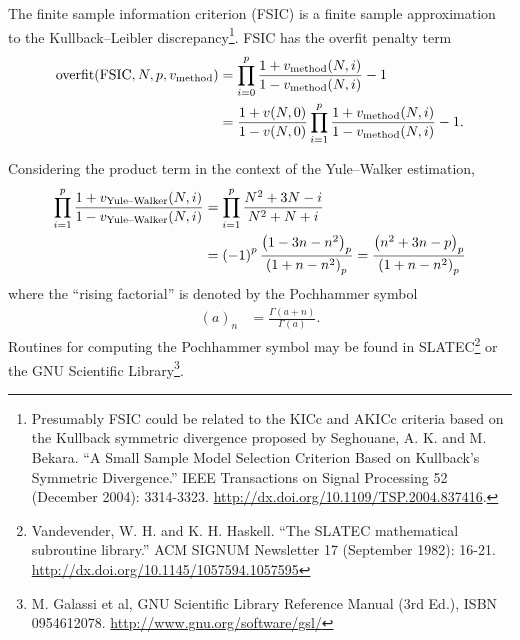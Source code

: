 \documentclass[12pt,letterpaper]{article}
\newcommand{\Pochhammer}[2]{\left(#1\right)_{#2}}
\begin{document}
The finite sample information criterion (FSIC) is a finite sample approximation
to the Kullback--Leibler discrepancy\footnote{ Presumably FSIC could be related
to the KICc and AKICc criteria based on the Kullback symmetric divergence
proposed by Seghouane, A. K. and M. Bekara.  ``A Small Sample Model Selection
Criterion Based on Kullback's Symmetric Divergence.'' IEEE Transactions on
Signal Processing 52 (December 2004): 3314-3323.
\url{http://dx.doi.org/10.1109/TSP.2004.837416}.}. FSIC has the overfit
penalty term
\begin{align}
    \text{overfit}\!\left(\text{FSIC},N,p,v_\text{method}\right)
    &=
    \prod_{i=0}^{p}
    \frac{
        1 + v_\text{method}\!\left(N,i\right)
    }{
        1 - v_\text{method}\!\left(N,i\right)
    }
    - 1
    \notag
    \\
    &=
    \frac{
        1 + v\!\left(N,0\right)
    }{
        1 - v\!\left(N,0\right)
    }
    \prod_{i=1}^{p}
    \frac{
        1 + v_\text{method}\!\left(N,i\right)
    }{
        1 - v_\text{method}\!\left(N,i\right)
    }
    - 1
    .
\end{align}

Considering the product term in the context of the Yule--Walker estimation,
\begin{align}
    \prod_{i=1}^{p}
    \frac{
        1 + v_\text{Yule--Walker}\!\left(N,i\right)
    }{
        1 - v_\text{Yule--Walker}\!\left(N,i\right)
    }
    &=
    \prod_{i=1}^{p}
    \frac{
        N^2 + 3N - i
    }{
        N^2 +  N + i
    }
    \notag
    \\
    &=
    \left(-1\right)^p
    \frac{
        \Pochhammer{1-3n-n^2}{p}
    }{
        \Pochhammer{1+ n-n^2}{p}
    }
    =
    \frac{
        \Pochhammer{n^2+3n-p}{p}
    }{
        \Pochhammer{1+n-n^2}{p}
    }
\end{align}
where the ``rising factorial'' is denoted by the Pochhammer symbol
\begin{align}
\Pochhammer{a}{n} &= \frac{\Gamma\left(a+n\right)}{\Gamma\left(a\right)}.
\end{align}
Routines for computing the Pochhammer symbol may be found in SLATEC\footnote{
Vandevender, W. H. and K. H. Haskell. ``The SLATEC mathematical subroutine
library.'' ACM SIGNUM Newsletter 17 (September 1982): 16-21.
\url{http://dx.doi.org/10.1145/1057594.1057595} } or the GNU Scientific
Library\footnote{ M. Galassi et al, GNU Scientific Library Reference Manual
(3rd Ed.), ISBN 0954612078. \url{http://www.gnu.org/software/gsl/} }.
\end{document}
